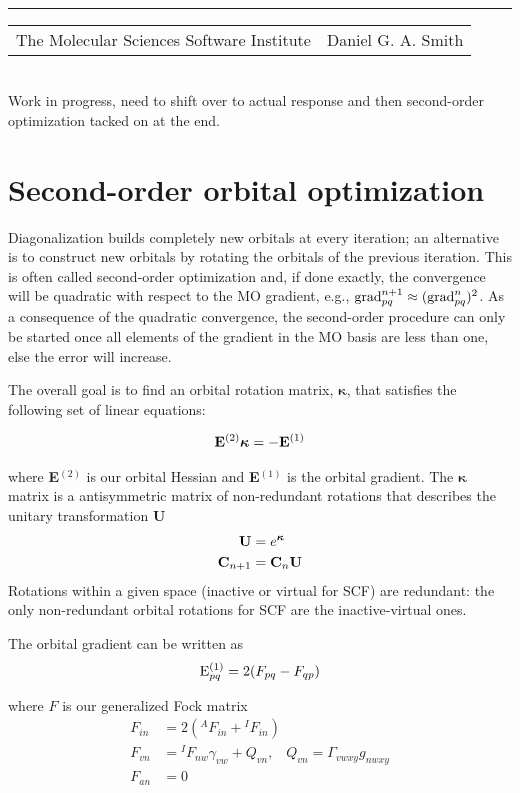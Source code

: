 \documentclass[aip,jcp,preprint,superscriptaddress,floatfix]{revtex4-1}
\renewcommand{\title}[1]{\textbf{\large{#1}}\\}
\newcommand{\leftright}[2]{\begin{tabularx}{\textwidth}{X>{\raggedleft}X}#1%
& #2\\\end{tabularx}\\[-1cm]}
\begin{document}
\title{}
\rule{\textwidth}{1pt}
\leftright{The Molecular Sciences Software Institute}{Daniel G. A. Smith} %

Work in progress, need to shift over to actual response and then second-order optimization tacked on at the end.

\bigskip
\section{Second-order orbital optimization}

Diagonalization builds completely new orbitals at every iteration; an alternative is to construct new orbitals by rotating the orbitals of the previous iteration.
This is often called second-order optimization and, if done exactly, the convergence will be quadratic with respect to the MO gradient\cite{Helgaker:2000ug}, e.g., ${\rm grad}_{pq}^{n+1} \approx ({{\rm grad}_{pq}^{n}}) ^2$.
As a consequence of the quadratic convergence, the second-order procedure can only be started once all elements of the gradient in the MO basis are less than one, else the error will increase.

The overall goal is to find an orbital rotation matrix, ${\bm \kappa}$, that satisfies the following set of linear equations:

\begin{eqnarray}
\label{somcscf_master}
{\rm\bf E}^{(2)} {\bm \kappa} = -{\rm\bf E}^{(1)}
\end{eqnarray}

where {\bf E}$^{(2)}$ is our orbital Hessian and {\bf E}$^{(1)}$ is the orbital gradient. 
The ${\bm \kappa}$ matrix is a antisymmetric matrix of non-redundant rotations that describes the unitary transformation {\bf U}
\begin{align}
 {\rm\bf U} &= e^{\bm \kappa}\\
 {\rm\bf C}_{n+1} &= {\rm\bf C}_{n}{\rm\bf U}
\end{align}
Rotations within a given space (inactive or virtual for SCF) are redundant: the only non-redundant orbital rotations for SCF are the inactive-virtual ones.

The orbital gradient can be written as
\begin{eqnarray}
{\rm E}^{(1)}_{pq} = 2(F_{pq} - F_{qp})
\end{eqnarray}

where $F$ is our generalized Fock matrix\cite{Helgaker:2000ug}
\begin{align}
F_{in} &= 2 ({^AF_{in}} + {^IF_{in}})\\
F_{vn}& ={^IF}_{nw}\gamma_{vw} + Q_{vn},\;\;\;      Q_{vn} = \Gamma_{vwxy}g_{nwxy}\\
F_{an} &= 0
\end{align}
\end{document}
